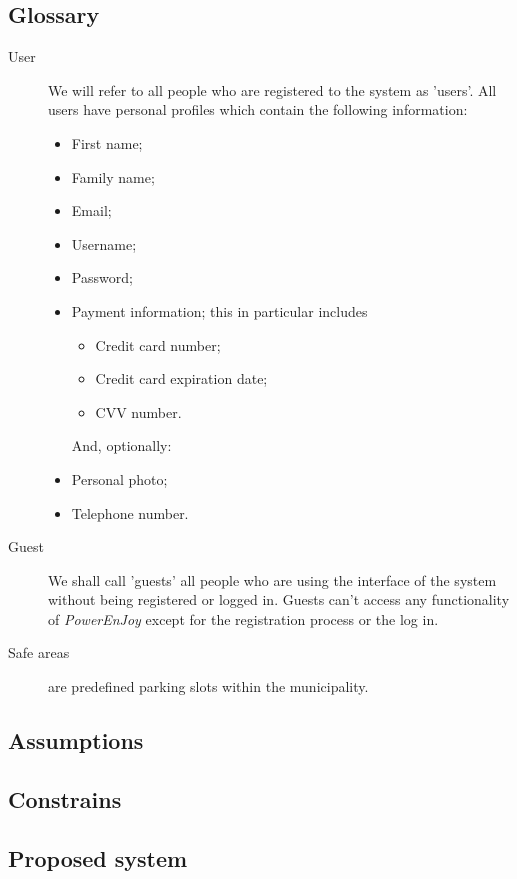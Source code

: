 \documentclass{article}
\begin{document}
		\subsection{Glossary}
			\begin{description}
				\item[User] We will refer to all people who are registered to the system as 'users'. All users have personal profiles which contain the following information:
				\begin{itemize}
					\item First name;
					\item Family name;
					\item Email;
					\item Username;
					\item Password;
					\item Payment information; this in particular includes
						\begin{itemize}
							\item Credit card number;
							\item Credit card expiration date;
							\item CVV number. %
						\end{itemize}
					And, optionally:
					\item Personal photo;
					\item Telephone number.
				\end{itemize}
				
				\item[Guest] We shall call 'guests' all people who are using the interface of the system without being registered or logged in. Guests can't access any functionality of \textit{PowerEnJoy} except for the registration process or the log in. 
				
				\item[Safe areas] are predefined parking slots within the municipality. 
			\end{description}

		\subsection{Assumptions}

		\subsection{Constrains}

		\subsection{Proposed system}
\end{document}
